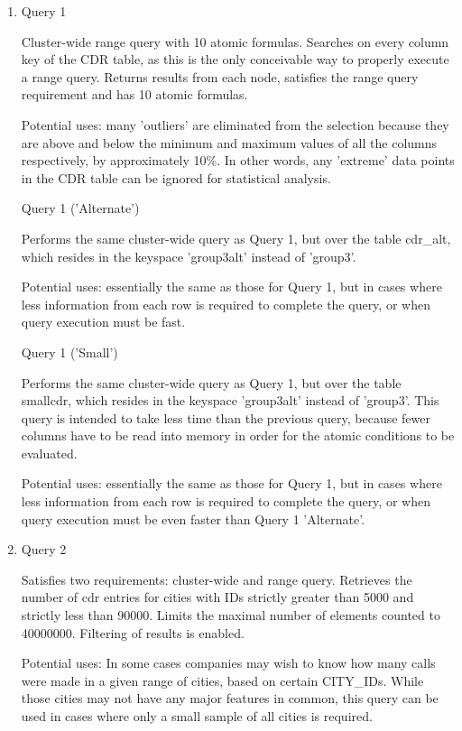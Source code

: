 \documentclass[letterpaper]{article}
\begin{document}
\begin{enumerate}
	\item Query 1
		

		Cluster-wide range query with 10 atomic formulas. Searches on
		every column key of the CDR table, as this is the only
		conceivable way to properly execute a range query.  Returns
		results from each node, satisfies the range query requirement
		and has 10 atomic formulas.

		Potential uses: many 'outliers' are eliminated from the
		selection because they are above and below the minimum and
		maximum values of all the columns
		respectively, by approximately 10\%. In other words, any
		'extreme' data points in the CDR table can be ignored for
		statistical analysis.

		Query 1 ('Alternate')
		

		Performs the same cluster-wide query as Query 1, but over the table cdr\_alt,
		which resides in the keyspace 'group3alt' instead of 'group3'.

		Potential uses: essentially the same as those for Query 1, but in cases
		where less information from each row is required to complete the query,
		or when query execution must be fast.

		Query 1 ('Small')
		

		Performs the same cluster-wide query as Query 1, but over the table smallcdr,
		which resides in the keyspace 'group3alt' instead of 'group3'. This query
		is intended to take less time than the previous query, because fewer columns
		have to be read into memory in order for the atomic conditions to be evaluated.

		Potential uses: essentially the same as those for Query 1, but in cases
		where less information from each row is required to complete the query,
		or when query execution must be even faster than Query 1 'Alternate'.

	\item Query 2
		

		Satisfies two requirements: cluster-wide and range query. Retrieves the number of
		cdr entries for cities with IDs strictly greater than 5000 and strictly less than
		90000. Limits the maximal number of elements counted to 40000000. Filtering of
		results is enabled.

		Potential uses: In some cases companies may wish to know how many calls were made
		in a given range of cities, based on certain CITY\_IDs. While
		those cities may not have any major features in common, this
		query can be used in cases where only a small
		sample of all cities is required.


\end{enumerate}
\end{document}
